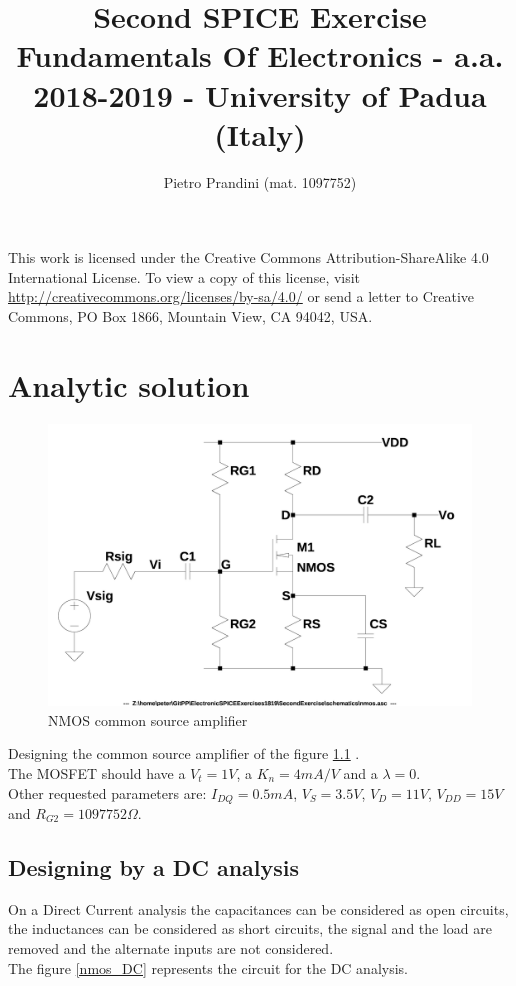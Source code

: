 \documentclass[10pt,a4paper]{book}
\title{Second SPICE Exercise\\{\small{Fundamentals Of Electronics - a.a. 2018-2019 -
University of Padua (Italy)}}}
\author{Pietro Prandini (mat. 1097752)}
\begin{document}
\maketitle

\vspace*{\fill}
\begin{center}
\tiny{This work is licensed under the Creative Commons Attribution-ShareAlike 4.0 International License. To view a copy of this license, visit \href{http://creativecommons.org/licenses/by-sa/4.0/}{http://creativecommons.org/licenses/by-sa/4.0/} or send a letter to Creative Commons, PO Box 1866, Mountain View, CA 94042, USA.}
\end{center}

\tableofcontents

\chapter{Analytic solution}

\begin{figure}[h]
  \centering
  \includegraphics[width=12cm]{schematics/nmos.jpg}
  \caption{NMOS common source amplifier}
  \label{nmos}
\end{figure}

Designing the common source amplifier of the figure \ref{nmos} .\\
The MOSFET should have a $V_t = 1V$, a $K_n = 4mA/V$ and a $\lambda = 0$.\\
Other requested parameters are: $I_{DQ} = 0.5mA$, $V_S = 3.5V$, $V_D = 11V$, $V_{DD} = 15V$ and $R_{G2} = 1097752\Omega$.\par

\section{Designing by a DC analysis}
On a Direct Current analysis the capacitances can be considered as open circuits, the inductances can be considered as short circuits, the signal and the load are removed and the alternate inputs are not considered.\\
The figure \ref{nmos_DC} represents the circuit for the DC analysis.\par
\end{document}

